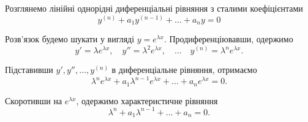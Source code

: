 Розглянемо лінійні однорідні диференціальні рівняння з сталими коефіцієнтами
\begin{equation*}
	y^{(n)} + a_1 y^{(n - 1)} + \ldots + a_n y = 0
\end{equation*}

Розв'язок будемо шукати у вигляді $y = e^{\lambda x}$. Продиференціювавши, одержимо 
\begin{equation*}
 	y' = \lambda e^{\lambda x}, \quad y'' = \lambda^2 e^{\lambda x}, \quad \ldots \quad y^{(n)} = \lambda^n e^{\lambda x}.
\end{equation*}

Підставивши $y', y'', \ldots, y^{(n)}$ в диференціальне рівняння, отримаємо
\begin{equation*}
	\lambda^n e^{\lambda x} + a_1 \lambda^{n - 1}e^{\lambda x} + \ldots + a_n e^{\lambda x} = 0.
\end{equation*}

Скоротивши на $e^{\lambda x}$, одержимо характеристичне рівняння
\begin{equation*}
	\lambda^n + a_1 \lambda^{n - 1} + \ldots + a_n = 0.
\end{equation*}


